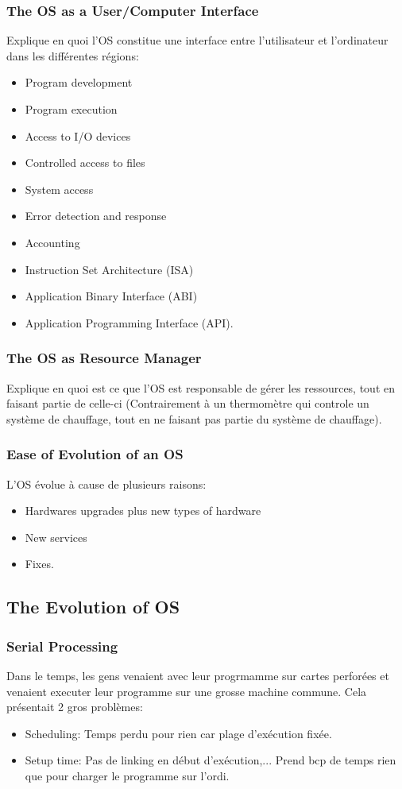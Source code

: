 \subsubsection{The OS as a User/Computer Interface}

Explique en quoi l'OS constitue une interface entre l'utilisateur et l'ordinateur dans les différentes régions:
\begin{itemize}
\item Program development
\item Program execution
\item Access to I/O devices
\item Controlled access to files
\item System access
\item Error detection and response
\item Accounting
\item Instruction Set Architecture (ISA)
\item Application Binary Interface (ABI)
\item Application Programming Interface (API).
\end{itemize}

\subsubsection{The OS as Resource Manager}
Explique en quoi est ce que l'OS est responsable de gérer les ressources,
tout en faisant partie de celle-ci (Contrairement à un thermomètre qui controle un système de chauffage,
tout en ne faisant pas partie du système de chauffage).

\subsubsection{Ease of Evolution of an OS}
L'OS évolue à cause de plusieurs raisons:
\begin{itemize}
  \item Hardwares upgrades plus new types of hardware
  \item New services
  \item Fixes.
\end{itemize}

\subsection{The Evolution of OS}

\subsubsection{Serial Processing}
Dans le temps, les gens venaient avec leur progrmamme sur cartes perforées et venaient executer leur programme sur une grosse machine commune.
Cela présentait 2 gros problèmes:
\begin{itemize}
  \item Scheduling: Temps perdu pour rien car plage d'exécution fixée.
  \item Setup time: Pas de linking en début d'exécution,...
Prend bcp de temps rien que
    pour charger le programme sur l'ordi.
\end{itemize}

